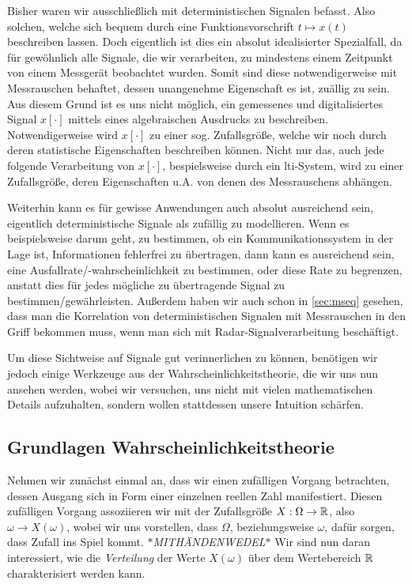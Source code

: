 Bisher waren wir ausschließlich mit deterministischen Signalen befasst. 
Also solchen, welche sich bequem durch eine Funktionsvorschrift $t \mapsto x(t)$ beschreiben lassen.
Doch eigentlich ist dies ein absolut idealisierter Spezialfall, da für gewöhnlich alle Signale, die wir verarbeiten, zu mindestens einem Zeitpunkt von einem Messgerät beobachtet wurden.
Somit sind diese notwendigerweise mit Messrauschen behaftet, dessen unangenehme Eigenschaft es ist, zuällig zu sein.
Aus diesem Grund ist es uns nicht möglich, ein gemessenes und digitalisiertes Signal $x[\cdot]$ mittels eines algebraischen Ausdrucks zu beschreiben.
Notwendigerweise wird $x[\cdot]$ zu einer sog. Zufallsgröße, welche wir  noch durch deren statistische Eigenschaften beschreiben können.
Nicht nur das, auch jede folgende Verarbeitung von $x[\cdot]$, bespielsweise durch ein \gls{lti}-System, wird zu einer Zufallsgröße, deren Eigenschaften u.A. von denen des Messrauschens abhängen.

Weiterhin kann es für gewisse Anwendungen auch absolut ausreichend sein, eigentlich deterministische Signale als zufällig zu modellieren.
Wenn es beispielsweise darum geht, zu bestimmen, ob ein Kommunikationssystem in der Lage ist, Informationen fehlerfrei zu übertragen, dann kann es ausreichend sein,  eine Ausfallrate/-wahrscheinlichkeit zu bestimmen, oder diese Rate zu begrenzen, anstatt dies für jedes mögliche zu übertragende Signal zu bestimmen/gewährleisten.
Außerdem haben wir auch schon in \cref{sec:mseq} gesehen, dass man die Korrelation von deterministischen Signalen mit Messrauschen in den Griff bekommen muss, wenn man sich mit Radar-Signalverarbeitung beschäftigt.

Um diese  Sichtweise auf Signale gut verinnerlichen zu können, benötigen wir jedoch einige Werkzeuge aus der Wahrscheinlichkeitstheorie, die wir uns nun ansehen werden, wobei wir versuchen, uns nicht mit vielen mathematischen Details aufzuhalten, sondern wollen stattdessen unsere Intuition schärfen.

\subsection{Grundlagen Wahrscheinlichkeitstheorie}\label{sec:random:prbly}

Nehmen wir zunächst einmal an, dass wir einen zufälligen Vorgang betrachten, dessen Ausgang sich in Form einer einzelnen reellen Zahl manifestiert.
Diesen zufälligen Vorgang assoziieren wir mit der Zufallsgröße $X : \Omega \rightarrow \mathbb{R}$, also $\omega \rightarrow X(\omega)$, wobei wir uns vorstellen, dass $\Omega$, beziehungsweise $\omega$, dafür sorgen, dass Zufall ins Spiel kommt. \textit{$\ast$MITHÄNDENWEDEL$\ast$} 
Wir sind nun daran interessiert, wie die \emph{Verteilung} der Werte $X(\omega)$ über dem Wertebereich $\mathbb{R}$ charakterisiert werden kann.

